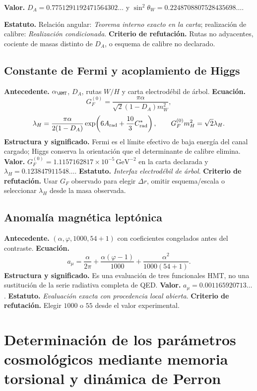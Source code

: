 \textbf{Valor.} \(D_A=0.7751291192471564302\ldots\) y
\(\sin^2\theta_W=0.2248708807528435698\ldots\).

\textbf{Estatuto.} Relaci\'on angular: \emph{Teorema interno exacto en la carta};
realizaci\'on de calibre: \emph{Realizaci\'on condicionada}.
\textbf{Criterio de refutación.} Rutas no adyacentes, cociente de masas
distinto de \(D_A\), o esquema de calibre no
declarado.

\subsection*{Constante de Fermi y acoplamiento de Higgs }
\textbf{Antecedente.} \(\alpha_{\HMT}\), \(D_A\), rutas \(W/H\) y carta
electrod\'ebil de \'arbol. \textbf{Ecuaci\'on.}
\[
G_F^{(0)}=\frac{\pi\alpha}{\sqrt2(1-D_A)m_W^2},
\]
\[
\lambda_H=\frac{\pi\alpha}{2(1-D_A)}
\exp\!\left(6A_{\rm rad}+\frac{10}{3}C^*_{\rm rad}\right),
\qquad G_F^{(0)}m_H^2=\sqrt2\lambda_H.
\]
\textbf{Estructura y significado.} Fermi es el l\'imite efectivo de baja
energ\'ia del canal cargado; Higgs conserva la orientaci\'on que el
determinante de calibre elimina.
\textbf{Valor.} \(G_F^{(0)}=1.1157162817\times10^{-5}\,\mathrm{GeV}^{-2}\)
en la carta declarada y \(\lambda_H=0.123847911548\ldots\).
\textbf{Estatuto.} \emph{Interfaz electrod\'ebil de \'arbol}.
\textbf{Criterio de refutación.} Usar \(G_F\) observado para elegir \(\Delta r\), omitir
esquema/escala o seleccionar \(\lambda_H\) desde la masa observada.

\subsection*{Anomal\'ia magn\'etica lept\'onica }
\textbf{Antecedente.} \((\alpha,\varphi,1000,54+1)\) con coeficientes
congelados antes del contraste. \textbf{Ecuaci\'on.}
\begin{equation}
a_\mu=\frac{\alpha}{2\pi}
+\frac{\alpha(\varphi-1)}{1000}
+\frac{\alpha^2}{1000(54+1)}.
\label{eq:atlas-anom-mu}
\end{equation}
\textbf{Estructura y significado.} Es una evaluaci\'on de tres funcionales HMT,
no una sustituci\'on de la serie radiativa completa de QED.
\textbf{Valor.} \(a_\mu=0.001165920713\ldots\).
\textbf{Estatuto.} \emph{Evaluaci\'on exacta con procedencia local abierta}.
\textbf{Criterio de refutación.} Elegir \(1000\) o \(55\) desde el valor experimental.

\section{Determinación de los parámetros cosmológicos mediante memoria torsional y dinámica de Perron}

